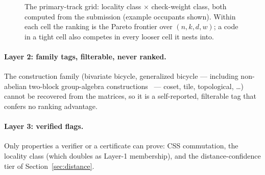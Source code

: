 \documentclass[11pt]{article}
\begin{document}
	\begin{figure}[h]
	\centering
	\caption{The primary-track grid: locality class $\times$ check-weight
	class, both computed from the submission (example occupants shown).
	Within each cell the ranking is the Pareto frontier over $(n,k,d,w)$; a
	code in a tight cell also competes in every looser cell it nests into.}
	\label{fig:grid}
	\end{figure}

	\paragraph{Layer 2: family tags, filterable, never ranked.} The
	construction family (bivariate bicycle, generalized bicycle --- including
	non-abelian two-block group-algebra
	constructions~\cite{lin2024quantum} --- coset, tile, topological,
	\dots) cannot be recovered from the matrices, so it is a
	self-reported, filterable tag that confers no ranking advantage.

	\paragraph{Layer 3: verified flags.} Only properties a verifier or a
	certificate can prove: CSS commutation, the locality class (which doubles
	as Layer-1 membership), and the distance-confidence tier of
	Section~\ref{sec:distance}.
\end{document}
